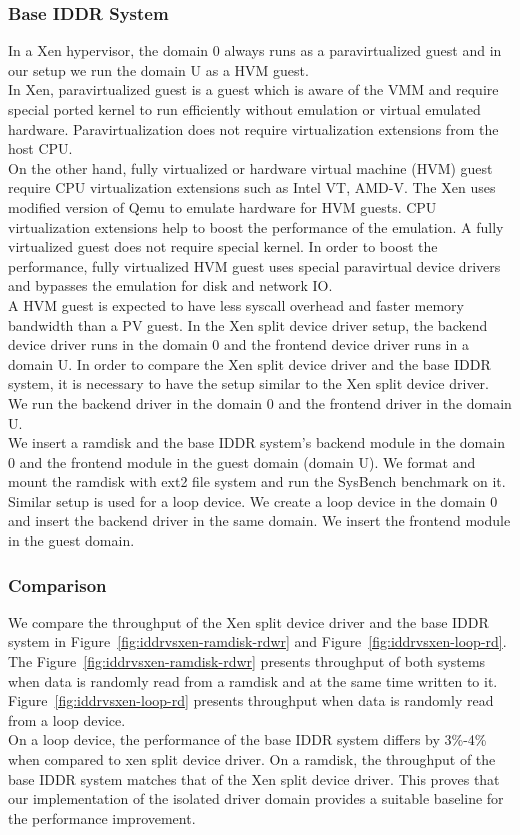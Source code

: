 \subsubsection*{Base IDDR System}
In a Xen hypervisor, the domain 0 always runs as a paravirtualized guest and in our setup we run the domain U as a HVM guest.
\\[3mm] 
In Xen, paravirtualized guest is a guest which is aware of the VMM and require special ported kernel to run efficiently without emulation or virtual emulated hardware. Paravirtualization does not require virtualization extensions from the host CPU. 
\\[3mm]
On the other hand, fully virtualized or hardware virtual machine (HVM) guest require CPU virtualization extensions such as Intel VT, AMD-V. The Xen uses modified version of Qemu to emulate hardware for HVM guests. CPU virtualization extensions help to boost the performance of the emulation. A fully virtualized guest does not require special kernel. In order to boost the performance, fully virtualized HVM guest uses special paravirtual device drivers and bypasses the emulation for disk and network IO.
\\[3mm]
A HVM guest is expected to have less syscall overhead and faster memory bandwidth than a PV guest. In the Xen split device driver setup, the backend device driver runs in the domain 0 and the frontend device driver runs in a domain U. In order to compare the Xen split device driver and the base IDDR system, it is necessary to have the setup similar to the Xen split device driver. We run the backend driver in the domain 0 and the frontend driver in the domain U.
\\[3mm]
We insert a ramdisk and the base IDDR system's backend module in the domain 0 and the frontend module in the guest domain (domain U). We format and mount the ramdisk with ext2 file system and run the SysBench benchmark on it.  
\\[3mm]
Similar setup is used for a loop device. We create a loop device in the domain 0 and insert the backend driver in the same domain. We insert the frontend module in the guest domain.

\subsubsection*{Comparison }
We compare the throughput of the Xen split device driver and the base IDDR system in Figure~\ref{fig:iddrvsxen-ramdisk-rdwr} and Figure~\ref{fig:iddrvsxen-loop-rd}. The Figure~\ref{fig:iddrvsxen-ramdisk-rdwr} presents throughput of both systems when data is randomly read from a ramdisk and at the same time written to it. Figure~\ref{fig:iddrvsxen-loop-rd} presents throughput when data is randomly read from a loop device. 
\\[3mm]
On a loop device, the performance of the base IDDR system differs by 3\%-4\% when compared to xen split device driver. On a ramdisk, the throughput of the base IDDR system matches that of the Xen split device driver. This proves that our implementation of the isolated driver domain provides a suitable baseline for the performance improvement.

